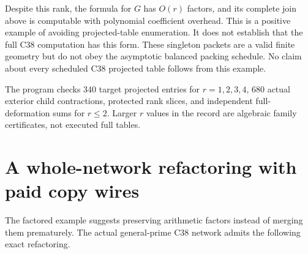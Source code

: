 \documentclass[11pt]{article}
\begin{document}
Despite this rank, the formula for $G$ has $O(r)$ factors, and its
complete join above is computable with polynomial coefficient overhead.
This is a positive example of avoiding projected-table enumeration.
It does not establish that the full C38 computation has this form.
These singleton packets are a valid finite geometry but do not obey the
asymptotic balanced packing schedule. No claim about every scheduled
C38 projected table follows from this example.

The program checks 340 target projected entries for $r=1,2,3,4$,
680 actual exterior child contractions, protected rank slices, and
independent full-deformation sums for $r\le2$. Larger $r$ values in
the record are algebraic family certificates, not executed full tables.

\section{A whole-network refactoring with paid copy wires}
The factored example suggests preserving arithmetic factors instead of
merging them prematurely. The actual general-prime C38 network admits
the following exact refactoring.
\end{document}
